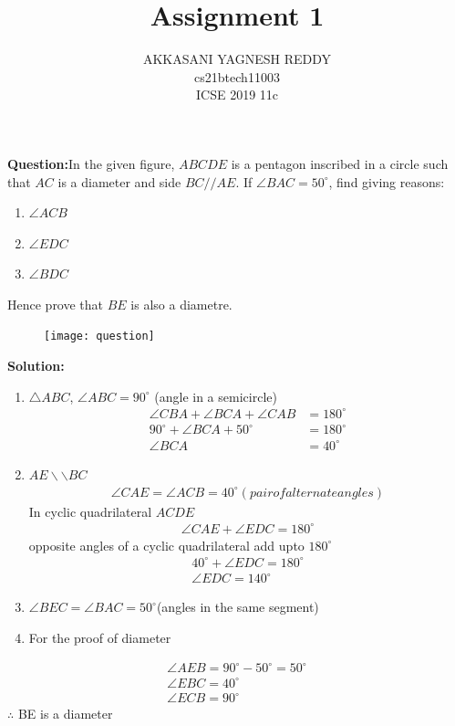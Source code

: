 \documentclass[journal,12pt,twocolumn]{IEEEtran}
\title{Assignment 1}
\author{AKKASANI YAGNESH REDDY \\
     cs21btech11003 \\
     ICSE 2019 11c}
\begin{document}
     \maketitle
     
    \textbf{Question:}In the given figure, $ABCDE$ is a pentagon inscribed in a circle such that $AC$ is a diameter and side $BC//AE$. If $ \angle{BAC} = 50^{\circ} $, find giving reasons:
    \begin{enumerate}
    \item $\angle ACB$
    \item $\angle EDC$
    \item $\angle BDC$
    \end{enumerate}
Hence prove that $BE$ is also a diametre.
    \begin{figure}[h!]  
            \texttt{[image: question]}
            \label{Fig1} 
             \caption{}
      \end{figure}
    \textbf{Solution:\\}
     \begin{enumerate}
    \item $\triangle ABC $,  $ \angle ABC = 90^{\circ} $ (angle in a semicircle)
    \begin{align}
      \angle{CBA} +\angle BCA+\angle CAB &=180^{\circ}\\
        90^{\circ}+\angle BCA+50^{\circ} &=180^{\circ}\\
        \angle BCA &=40^{\circ}
    \end{align}
    \item $AE \backslash\backslash BC$
    \begin{align}
     \angle CAE=\angle ACB=40^{\circ}(pair of alternate angles)
     \end{align}
     In cyclic quadrilateral $ACDE$
     \begin{align}
         \angle CAE + \angle EDC=180^{\circ}
     \end{align}
      opposite angles of a cyclic quadrilateral add upto $180^{\circ}$ \\
      \begin{align}
        40^{\circ}+\angle EDC=180^{\circ}\\
        \angle EDC =140^{\circ}
      \end{align}
      \item $\angle BEC= \angle BAC=50^{\circ}$(angles in the same segment)
      \item For the proof of diameter
      \end{enumerate}
      \begin{align}
      \angle AEB=90^{\circ}-50^{\circ}=50^{\circ}\\
      \angle EBC=40^{\circ}\\
      \angle ECB=90^{\circ}
            \end{align}
$\therefore$ BE is a diameter\\
\end{document}
